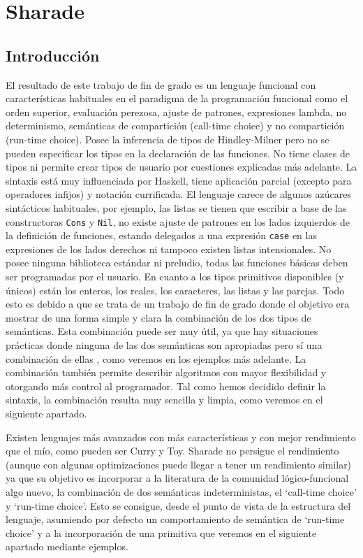 \documentclass[class=article, crop=false]{standalone}
\begin{document}
\section{Sharade}
\subsection{Introducción}

El resultado de este trabajo de fin de grado es un lenguaje funcional con características
habituales en el paradigma de la programación funcional como el orden superior, evaluación
perezosa, ajuste de patrones, expresiones lambda, no determinismo, semánticas de compartición
(call-time choice) y no compartición (run-time choice). Posee la inferencia de tipos de
Hindley-Milner pero no se pueden especificar los tipos en la declaración de las funciones. No
tiene clases de tipos ni permite crear tipos de usuario por cuestiones explicadas más
adelante. La sintaxis está muy influenciada por Haskell, tiene aplicación parcial (excepto
para operadores infijos) y notación currificada. El lenguaje carece de algunos azúcares
sintácticos habituales, por ejemplo, las listas se tienen que escribir a base de las
constructoras \verb`Cons` y \verb`Nil`, no existe ajuste de patrones en los lados izquierdos
de la definición de funciones, estando delegados a una  expresión \verb`case` en las
expresiones de los lados derechos ni tampoco existen listas intensionales. No posee ninguna
biblioteca estándar ni preludio, todas las funciones básicas deben ser programadas por el
usuario. En cuanto a los tipos primitivos disponibles (y únicos) están los enteros, los
reales, los caracteres, las listas y las parejas. Todo esto es debido a que se trata de un
trabajo de fin de grado donde el objetivo era mostrar de una forma simple y clara la
combinación de los dos tipos de semánticas. Esta combinación puede ser muy útil, ya que hay
situaciones prácticas donde ninguna de las dos semánticas son apropiadas pero sí una
combinación de ellas \cite{lopez2009flexible}, como veremos en los ejemplos más
adelante. La combinación también permite describir algoritmos con mayor flexibilidad y
otorgando más control al programador. Tal como hemos decidido definir la sintaxis, la
combinación resulta muy sencilla y limpia, como veremos en el siguiente apartado.

Existen lenguajes más avanzados con más características y con mejor rendimiento que el mío,
como pueden ser Curry y Toy. Sharade no persigue el rendimiento (aunque con algunas
optimizaciones puede llegar a tener un rendimiento similar) ya que su objetivo es incorporar
a la literatura de la comunidad lógico-funcional algo nuevo, la combinación de dos semánticas
indeterministas, el `call-time choice' y `run-time choice'. Esto se consigue, desde el punto
de vista de la estructura del lenguaje, asumiendo por defecto un comportamiento de semántica
de `run-time choice' y a la incorporación de una primitiva que veremos en el siguiente
apartado mediante ejemplos.
\end{document}
